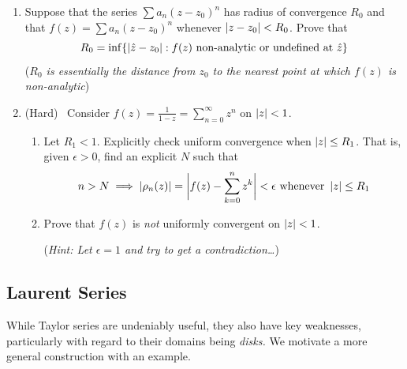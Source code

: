 \begin{exercises*}
\begin{enumerate}
	\item\label{ex:raddistnonanalytic} Suppose that the series $\sum a_n(z-z_0)^n$ has radius of convergence $R_0$ and that $f(z)=\sum a_n(z-z_0)^n$ whenever $\left| z-z_0\right|<R_0$. Prove that
	\[R_0=\inf\{\left| \hat z-z_0\right|:f(z)\text{ non-analytic or undefined at $\hat z$}\}\]
	(\emph{$R_0$ is essentially the distance from $z_0$ to the nearest point at which $f(z)$ is non-analytic})
	
	\item\label{ex:notuniform} (Hard) \ Consider $f(z)=\frac 1{1-z}=\sum\limits_{n=0}^\infty z^n$ on $\left| z\right|<1$.
	\begin{enumerate}
	  \item Let $R_1<1$. Explicitly check uniform convergence when $\left| z\right|\le R_1$. That is, given $\epsilon>0$, find an explicit $N$ such that
	  \[n>N\implies \left| \rho_n(z)\right|=\biggl|f(z)-\sum_{k=0}^nz^k\biggr|<\epsilon\text{ whenever }\left| z\right|\le R_1\]
	  \item Prove that $f(z)$ is \emph{not} uniformly convergent on $\left| z\right|<1$.\par
	  (\emph{Hint: Let $\epsilon=1$ and try to get a contradiction\ldots})
	\end{enumerate}
\end{enumerate}
\end{exercises*}\clearpage


\subsection{Laurent Series}

While Taylor series are undeniably useful, they also have key weaknesses, particularly with regard to their domains being \emph{disks.} We motivate a more general construction with an example.


